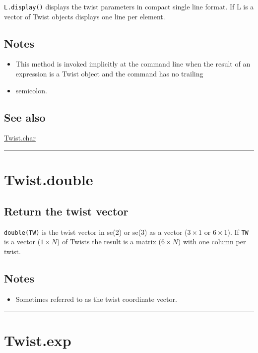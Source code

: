 \texttt{L.display()} displays the twist parameters in compact single line format.  If L is a
vector of Twist objects displays one line per element.


\subsection*{Notes}
\begin{itemize}
  \item This method is invoked implicitly at the command line when the result    of an expression is a Twist object and the command has no trailing
  \item semicolon.
\end{itemize}

\subsection*{See also}


\hyperlink{Twist.char}{\color{blue} Twist.char}

\vspace{1.5ex}\hrule

\hypertarget{Twist.double}{\section*{Twist.double}}
\subsection*{Return the twist vector}


\texttt{double(TW)} is the twist vector in se(2) or se(3) as a vector ($3 \times 1$ or
$6 \times 1$). If \texttt{TW} is a vector ($1 \times N$) of Twists the result is a matrix ($6 \times N$) with
one column per twist.


\subsection*{Notes}
\begin{itemize}
  \item Sometimes referred to as the twist coordinate vector.
\end{itemize}
\vspace{1.5ex}\hrule

\hypertarget{Twist.exp}{\section*{Twist.exp}}
